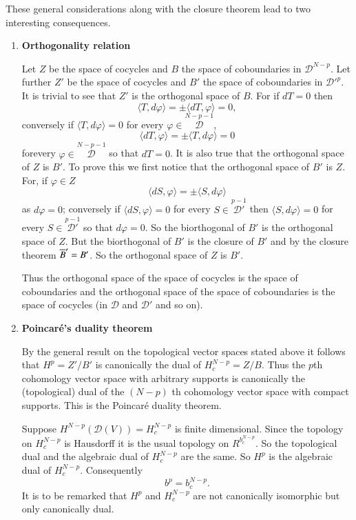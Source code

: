 These general considerations along with the closure theorem lead to
two interesting consequences.
\begin{enumerate}
\renewcommand{\theenumi}{\roman{enumi}}
\renewcommand{\labelenumi}{\theenumi)}
\item {\bf Orthogonality relation}

Let $Z$ be the space of cocycles and $B$ the space of coboundaries in
$\mathscr{D}^{N-p}$. Let further $Z'$ be the space of cocycles and
$B'$ the space of coboundaries in ${\mathscr{D}'}^{p}$. It is trivial
to see that $Z'$ is the orthogonal space of $B$. For if $dT=0$ then 
$$
\langle T,d\varphi\rangle=\pm \langle dT,\varphi\rangle =0,
$$
conversely if $\langle T,d\varphi\rangle=0$ for every $\varphi\in
\overset{N-p-1}{\mathscr{D}}$, 
$$
\langle dT,\varphi\rangle=\pm \langle T,d\varphi\rangle =0
$$
for\pageoriginale every $\varphi\in \overset{N-p-1}{\mathscr{D}}$ so
that $dT=0$. It is also true that the orthogonal space of $Z$ is
$B'$. To prove this we first notice that the orthogonal space of $B'$
is $Z$. For, if $\varphi\in Z$ 
$$
\langle dS,\varphi\rangle=\pm \langle S,d\varphi\rangle
$$
as $d\varphi=0$; conversely if $\langle dS,\varphi\rangle=0$ for every
$S\in \overset{p-1}{\mathscr{D}'}$ then $\langle S,d\varphi\rangle=0$
for every $S\in\overset{p-1}{\mathscr{D}'}$ so that $d\varphi=0$. So
the biorthogonal of $B'$ is the orthogonal space of $Z$. But the
biorthogonal of $B'$ is the closure of $B'$ and by the closure theorem
$\overline{B}'=B'$. So the orthogonal space of $Z$ is $B'$.

Thus the orthogonal space of the space of cocycles is the space of
coboundaries and the orthogonal space of the space of coboundaries is
the space of cocycles (in $\mathscr{D}$ and $\mathscr{D}'$ and so on).

\item {\bf Poincar\'e's duality theorem}

By the general result on the topological vector spaces stated above it
follows that $H^{p}=Z'/B'$ is canonically the dual of
$H^{N-p}_{c}=Z/B$. Thus the $p$th cohomology vector space with
arbitrary supports is canonically the (topological) dual of the
$(N-p)$ th cohomology vector space with compact supports. This is the
Poincar\'e duality theorem.

Suppose $H^{N-p}(\mathscr{D}(V))=H^{N-p}_{c}$ is finite
dimensional. Since the topology on $H^{N-p}_{c}$ is Hausdorff it is
the usual topology on $R^{b_{c}^{N-p}}$. So the topological dual and
the algebraic dual of $H^{N-p}_{c}$ are the same. So $H^{p}$ is the
algebraic dual of $H^{N-p}_{c}$. Consequently
$$
b^{p}=b^{N-p}_{c}.
$$
It is to be remarked that $H^{p}$ and $H^{N-p}_{c}$ are not
canonically isomorphic but only canonically dual.
\end{enumerate}
